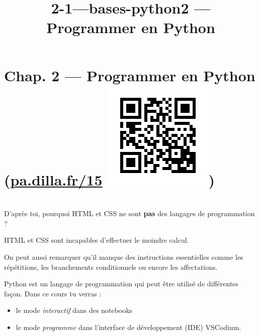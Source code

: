 \documentclass[a4paper,17pt]{extarticle}
\title{2-1---bases-python}
\newenvironment{eleve}%
{\begin{activite}\color{noiramu}\\[-0.5cm]}
{\end{activite}}
\providecommand{\tightlist}{%
      \setlength{\itemsep}{0pt}\setlength{\parskip}{0pt}}
\begin{document}
    
    \title{2 --- Programmer en Python}

    
    

    
    \hypertarget{chap.-2-programmer-en-python-pa.dilla.fr15}{%
\section[Chap. 2 --- Programmer en Python
(\href{https://pa.dilla.fr/15}{pa.dilla.fr/15} )]{\texorpdfstring{Chap.
2 --- Programmer en Python
(\href{https://pa.dilla.fr/15}{pa.dilla.fr/15}
\protect\includegraphics{res/qr-basthon.png})}{Chap. 2 --- Programmer en Python (pa.dilla.fr/15 )}}\label{chap.-2-programmer-en-python-pa.dilla.fr15}}
\begin{eleve}
    D'après toi, pourquoi HTML et CSS ne sont \textbf{pas} des langages de
programmation ?
        
        \end{eleve}\begin{reponse}
    HTML et CSS sont incapables d'effectuer le moindre calcul.

On peut aussi remarquer qu'il manque des instructions essentielles comme
les répétitions, les branchements conditionnels ou encore les
affectations.

        \end{reponse}
    Python est un langage de programmation qui peut être utilisé de
différentes façon. Dans ce cours tu verras :

\begin{itemize}
\tightlist
\item
  le mode \emph{interactif} dans des notebooks
\item
  le mode \emph{programme} dans l'interface de développement (IDE)
  VSCodium.
\end{itemize}
\end{document}
